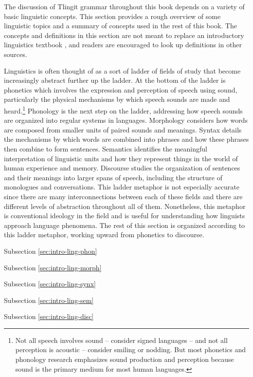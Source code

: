 The discussion of Tlingit grammar throughout this book depends on a variety of basic linguistic concepts. This section provides a rough overview of some linguistic topics and a summary of concepts used in the rest of this book. The concepts and definitions in this section are not meant to replace an introductory linguistics textbook \parencites[e.g.][]{radford-atkinson-britain-etc:2009}{yule:2010}{anderson:2018}, and readers are encouraged to look up definitions in other sources.

Linguistics is often thought of as a sort of ladder of fields of study that become increasingly abstract further up the ladder.  At the bottom of the ladder is phonetics which involves the expression and perception of speech using sound, particularly the physical mechanisms by which speech sounds are made and heard.\footnote{Not all speech involves sound – consider signed languages – and not all perception is acoustic – consider smiling or nodding. But most phonetics and phonology research emphasizes sound production and perception because sound is the primary medium for most human languages.} Phonology is the next step on the ladder, addressing how speech sounds are organized into regular systems in languages. Morphology considers how words are composed from smaller units of paired sounds and meanings. Syntax details the mechanisms by which words are combined into phrases and how these phrases then combine to form sentences. Semantics identifies the meaningful interpretation of linguistic units and how they represent things in the world of human experience and memory. Discourse studies the organization of sentences and their meanings into larger spans of speech, including the structure of monologues and conversations. This ladder metaphor is not especially accurate since there are many interconnections between each of these fields and there are different levels of abstraction throughout all of them. Nonetheless, this metaphor is conventional ideology in the field and is useful for understanding how linguists approach language phenomena. The rest of this section is organized according to this ladder metaphor, working upward from phonetics to discourse.

Subsection \ref{sec:intro-ling-phon} 

Subsection \ref{sec:intro-ling-morph}

Subsection \ref{sec:intro-ling-synx}

Subsection \ref{sec:intro-ling-sem}

Subsection \ref{sec:intro-ling-disc}

